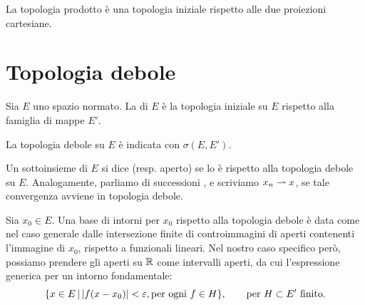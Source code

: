 \begin{example}
	La topologia prodotto è una topologia iniziale rispetto alle due proiezioni cartesiane.
\end{example}

\section{Topologia debole}
\begin{definition}
	Sia $E$ uno spazio normato.
	La  di $E$ è la topologia iniziale su $E$ rispetto alla famiglia di mappe $E'$.
\end{definition}

\begin{remark}
	La topologia debole su $E$ è indicata con $\sigma(E, E')$.
\end{remark}

Un sottoinsieme di $E$ si dice  (resp. aperto) se lo è rispetto alla topologia debole su $E$. Analogamente, parliamo di successioni , e scriviamo $x_n \rightharpoonup x$, se tale convergenza avviene in topologia debole.

Sia $x_0 \in E$. Una base di intorni per $x_0$ rispetto alla topologia debole è data come nel caso generale dalle intersezione finite di controimmagini di aperti contenenti l'immagine di $x_0$, rispetto a funzionali lineari.
Nel nostro caso specifico però, possiamo prendere gli aperti su $\mathbb{R}$ come intervalli aperti, da cui l'espressione generica per un intorno fondamentale:
\begin{equation*}
	\{x \in E \,|\, |f(x - x_0)| < \varepsilon, \text{per ogni $f \in H$} \}, \qquad \text{per $H \subset E'$ finito}.
\end{equation*}

